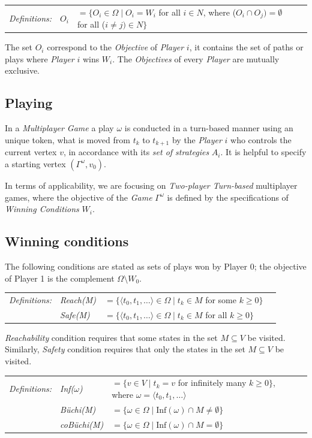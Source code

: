 \documentclass[12pt]{extarticle}
\newcommand{\definition}[1] {
    \begin{tcolorbox}[colback=mygray,colframe=mygray,sharp corners=all,top=0.01cm,bottom=0.01cm,left=0.1cm]
    \small
    \setlength{\tabcolsep}{2pt}
    \begin{tabular}{l l l l}
        \textit{Definitions:} & #1
    \end{tabular}
    \end{tcolorbox}
}
\begin{document}
\definition{
    $O_i $&$ = \{ O_i \in \Omega \mid O_i = W_i $ for all $i \in N$, where ($O_i \cap O_j) = \emptyset$ for all ($i \neq j) \in N \}$
}
The set $O_i$ correspond to the \textit{Objective} of \textit{Player} $i$, it contains the set of paths or plays where \textit{Player} $i$ wins $W_i$.  The \textit{Objectives} of every \textit{Player} are mutually exclusive.

\subsection{Playing}

In a \textit{Multiplayer Game} a play $\omega$ is conducted in a turn-based manner using an unique token, what is moved from $t_k$ to $t_{k+1}$ by the \textit{Player} $i$ who controls the current vertex $v$, in accordance with its \textit{set of strategies} $A_i$.  It is helpful to specify a starting vertex $(\Gamma^\omega,v_0)$.

In terms of applicability, we are focusing on \textit{Two-player Turn-based} multiplayer games, where the objective of the \textit{Game} $\Gamma^\omega$ is defined by the specifications of \textit{Winning Conditions} $W_i$.

\subsection{Winning conditions}

The following conditions are stated as sets of plays won by Player 0; the objective of Player 1 is the complement $\Omega \setminus W_0$.

\definition{
    \textit{Reach(M)} &$ = \{\langle t_0,t_1,\ldots \rangle \in \Omega \mid t_k \in M$ for some $k \geqslant 0\}$
    \\ & \textit{Safe(M)} &$ = \{\langle t_0,t_1,\ldots \rangle \in \Omega \mid t_k \in M$ for all $k \geqslant 0\}$
}
\textit{Reachability} condition requires that some states in the set $M \subseteq V$ be visited. Similarly, \textit{Safety} condition requires that only the states in the set $M \subseteq V$ be visited.

\definition{
    \textit{Inf($\omega$)} &$ = \{v \in V \mid t_k = v$ for infinitely many $k \geqslant 0\}$, where $\omega = \langle t_0,t_1,\ldots \rangle$
    \\ & \textit{B\"uchi(M)} &$ = \{\omega \in \Omega \mid \mathrm{Inf}(\omega) \cap M \neq \emptyset\}$
    \\ & \textit{coB\"uchi(M)} &$ = \{\omega \in \Omega \mid \mathrm{Inf}(\omega) \cap M = \emptyset\}$
}
\end{document}
